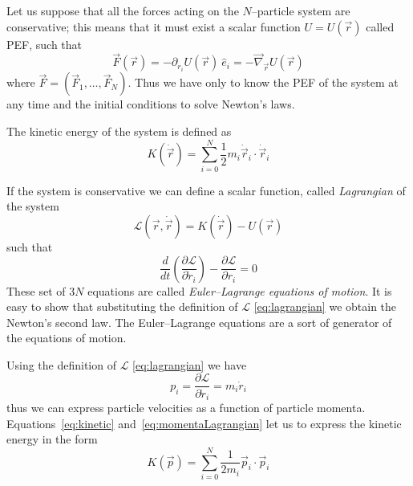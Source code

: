 Let us suppose that all the forces acting on the $N$--particle system are conservative; this means that it must
exist a scalar function $U = U(\vec r)$ called \ac{PEF}, such that
\begin{equation}
	\vec F(\vec r) = -\partial_{r_i} U(\vec r)\ \hat e_i = -\vec\nabla_{\vec r} U(\vec r)
	\label{eq:pefForces}
\end{equation}
where $\vec F = (\vec F_1,\dots, \vec F_N)$. Thus we have only to know the \ac{PEF} of the system at any time and
the initial conditions to solve Newton's laws.

The kinetic energy of the system is defined as
\begin{equation}
	K(\dot{\vec r}) = \sum_{i=0}^{N}\frac{1}{2}m_i \dot{\vec r}_i\cdot \dot{\vec r}_i
	\label{eq:kinetic}
\end{equation}

If the system is conservative we can define a scalar function, called \textit{Lagrangian} of the system
\begin{equation}
	\mathcal{L}(\vec r,\dot{\vec r}) = K(\dot{\vec r}) - U(\vec r)
	\label{eq:lagrangian}
\end{equation}
such that
\begin{equation}
	\frac{d}{dt}\left ( \frac{\partial \mathcal{L}}{\partial \dot r_{i}}\right ) - \frac{\partial\mathcal{L}}{\partial r_{i}} = 0
	\label{eq:EulerLagrange}
\end{equation}
These set of $3N$ equations are called \textit{Euler--Lagrange equations of motion}. It is easy to show that
substituting the definition of $\mathcal{L}$ \eqref{eq:lagrangian} we obtain the Newton's second law. The
Euler--Lagrange equations are a sort of generator of the equations of motion.

Using the definition of $\mathcal{L}$ \eqref{eq:lagrangian} we have
\begin{equation}
	p_i = \frac{\partial\mathcal{L}}{\partial \dot r_i} = m_i\dot r_i
	\label{eq:momentaLagrangian}
\end{equation}
thus we can express particle velocities as a function of particle momenta. Equations~\eqref{eq:kinetic}
and~\eqref{eq:momentaLagrangian} let us to express the kinetic energy in the form
\begin{equation}
	K(\vec p) = \sum_{i=0}^N \frac{1}{2m_i}\vec p_i \cdot \vec p_i
	\label{eq:kineticP}
\end{equation}

